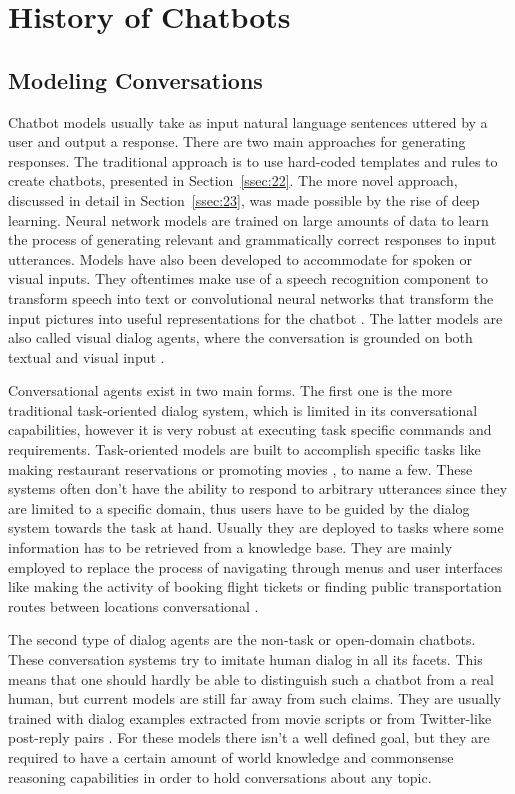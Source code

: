 \documentclass[12pt]{article}
\begin{document}
\newpage\section{History of Chatbots} \label{sec:history}

\subsection{Modeling Conversations} \label{ssec:21}
Chatbot models usually take as input natural language sentences uttered by a user and output a response. There are two main approaches for generating responses. The traditional approach is to use hard-coded templates and rules to create chatbots, presented in Section~\ref{ssec:22}. The more novel approach, discussed in detail in Section~\ref{ssec:23}, was made possible by the rise of deep learning. Neural network models are trained on large amounts of data to learn the process of generating relevant and grammatically correct responses to input utterances. Models have also been developed to accommodate for spoken or visual inputs. They oftentimes make use of a speech recognition component to transform speech into text \cite{Serban:2017} or convolutional neural networks \cite{Imagenet:2012} that transform the input pictures into useful representations for the chatbot \cite{Havrylov:2017}. The latter models are also called visual dialog agents, where the conversation is grounded on both textual and visual input \cite{Das:2017}.

Conversational agents exist in two main forms. The first one is the more traditional task-oriented dialog system, which is limited in its conversational capabilities, however it is very robust at executing task specific commands and requirements. Task-oriented models are built to accomplish specific tasks like making restaurant reservations \cite{Joshi:2017,Bordes:2016} or promoting movies \cite{Yu:2017}, to name a few. These systems often don't have the ability to respond to arbitrary utterances since they are limited to a specific domain, thus users have to be guided by the dialog system towards the task at hand. Usually they are deployed to tasks where some information has to be retrieved from a knowledge base. They are mainly employed to replace the process of navigating through menus and user interfaces like making the activity of booking flight tickets or finding public transportation routes between locations conversational \cite{Zhao:2017}.  

The second type of dialog agents are the non-task or open-domain chatbots. These conversation systems try to imitate human dialog in all its facets. This means that one should hardly be able to distinguish such a chatbot from a real human, but current models are still far away from such claims. They are usually trained with dialog examples extracted from movie scripts or from Twitter-like post-reply pairs \cite{Vinyals:2015,Shang:2015,Serban:2015,Li:2016}. For these models there isn't a well defined goal, but they are required to have a certain amount of world knowledge and commonsense reasoning capabilities in order to hold conversations about any topic.
\end{document}
